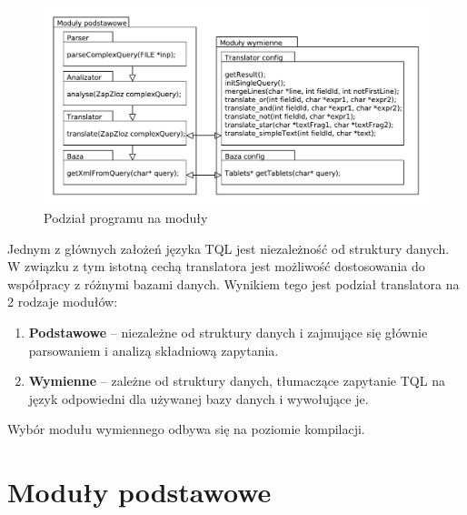 \documentclass{pracamgr}
\begin{document}
\begin{figure}
 \centering
 \includegraphics[width=500px,bb=0 0 585 300]{./diagramy/pakiety.pdf}
 \caption{Podział programu na moduły}
\end{figure}
Jednym z głównych założeń języka TQL jest niezależność od struktury danych.
W związku z tym istotną cechą translatora jest możliwość dostosowania do współpracy z różnymi bazami danych.
 Wynikiem tego jest podział translatora na 2 rodzaje modułów:
\begin{enumerate}
 \item \textbf{Podstawowe} -- niezależne od struktury danych i zajmujące się głównie parsowaniem i analizą składniową zapytania.
 \item \textbf{Wymienne} -- zależne od struktury danych, tłumaczące zapytanie TQL na język odpowiedni dla używanej bazy danych
i wywołujące je.
\end{enumerate}
 Wybór modułu wymiennego odbywa się na poziomie kompilacji. 


\section{Moduły podstawowe}
\end{document}

